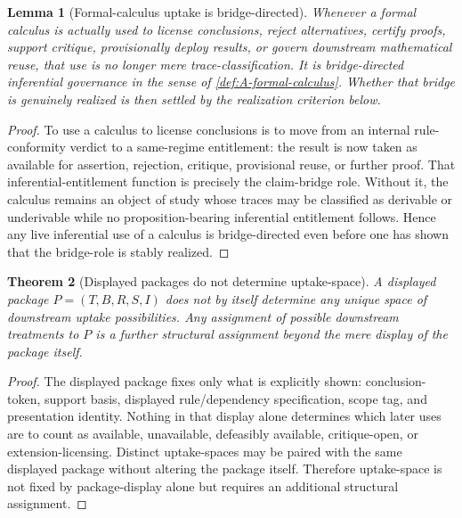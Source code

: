 \documentclass[11pt]{article}
\theoremstyle{plain}
\newtheorem{theorem}{Theorem}[section]
\newtheorem{lemma}[theorem]{Lemma}
\theoremstyle{definition}
\begin{document}
\begin{lemma}[Formal-calculus uptake is bridge-directed]
\label{lem:A-bridge-dependent}
Whenever a formal calculus is actually used to license conclusions, reject alternatives, certify proofs, support critique, provisionally deploy results, or govern downstream mathematical reuse, that use is no longer mere trace-classification. It is bridge-directed inferential governance in the sense of \cref{def:A-formal-calculus}. Whether that bridge is genuinely realized is then settled by the realization criterion below.
\end{lemma}

\begin{proof}
To use a calculus to license conclusions is to move from an internal rule-conformity verdict to a same-regime entitlement: the result is now taken as available for assertion, rejection, critique, provisional reuse, or further proof. That inferential-entitlement function is precisely the claim-bridge role. Without it, the calculus remains an object of study whose traces may be classified as derivable or underivable while no proposition-bearing inferential entitlement follows. Hence any live inferential use of a calculus is bridge-directed even before one has shown that the bridge-role is stably realized.
\end{proof}

\begin{theorem}[Displayed packages do not determine uptake-space]
\label{thm:A-package-not-uptake}
A displayed package $P=(T,B,R,S,I)$ does not by itself determine any unique space of downstream uptake possibilities. Any assignment of possible downstream treatments to $P$ is a further structural assignment beyond the mere display of the package itself.
\end{theorem}

\begin{proof}
The displayed package fixes only what is explicitly shown: conclusion-token, support basis, displayed rule/dependency specification, scope tag, and presentation identity. Nothing in that display alone determines which later uses are to count as available, unavailable, defeasibly available, critique-open, or extension-licensing. Distinct uptake-spaces may be paired with the same displayed package without altering the package itself. Therefore uptake-space is not fixed by package-display alone but requires an additional structural assignment.
\end{proof}
\end{document}
